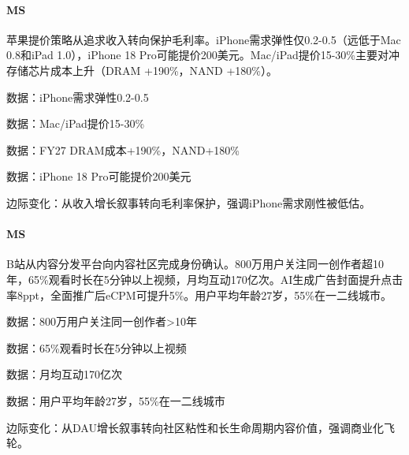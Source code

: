 \documentclass[11pt]{ctexart}
\begin{document}
\paragraph{MS} 苹果提价策略从追求收入转向保护毛利率。iPhone需求弹性仅0.2-0.5（远低于Mac 0.8和iPad 1.0），iPhone 18 Pro可能提价200美元。Mac/iPad提价15-30\%主要对冲存储芯片成本上升（DRAM +190\%，NAND +180\%）。
{\small\color{refgray}数据：iPhone需求弹性0.2-0.5\par}
{\small\color{refgray}数据：Mac/iPad提价15-30\%\par}
{\small\color{refgray}数据：FY27 DRAM成本+190\%，NAND+180\%\par}
{\small\color{refgray}数据：iPhone 18 Pro可能提价200美元\par}
{\small\color{refgray}边际变化：从收入增长叙事转向毛利率保护，强调iPhone需求刚性被低估。\par}
\paragraph{MS} B站从内容分发平台向内容社区完成身份确认。800万用户关注同一创作者超10年，65\%观看时长在5分钟以上视频，月均互动170亿次。AI生成广告封面提升点击率8ppt，全面推广后eCPM可提升5\%。用户平均年龄27岁，55\%在一二线城市。
{\small\color{refgray}数据：800万用户关注同一创作者>10年\par}
{\small\color{refgray}数据：65\%观看时长在5分钟以上视频\par}
{\small\color{refgray}数据：月均互动170亿次\par}
{\small\color{refgray}数据：用户平均年龄27岁，55\%在一二线城市\par}
{\small\color{refgray}边际变化：从DAU增长叙事转向社区粘性和长生命周期内容价值，强调商业化飞轮。\par}
\end{document}
